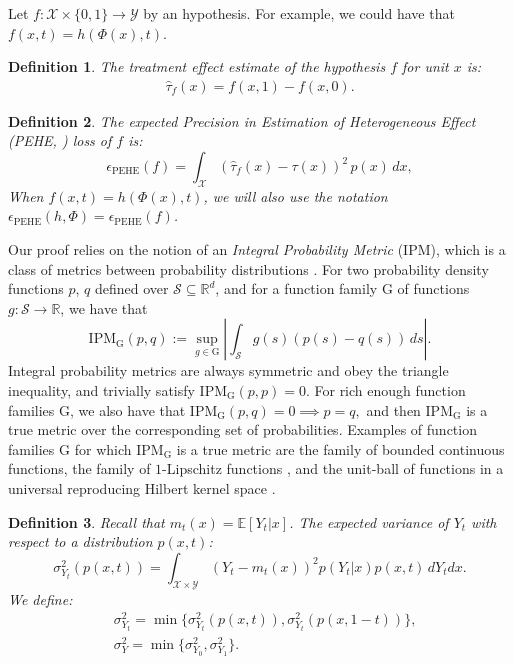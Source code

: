\documentclass{article}
\newtheorem{thmdef}{Definition}
\def\E{\mathbb{E}}
\def\cX{\mathcal X}
\def\cY{\mathcal Y}
\def\cS{\mathcal S}
\def\cF{\mathrm{G}}
\def \R{\mathbb{R}}
\def \epehe{\epsilon_{\text{PEHE}}}
\begin{document}
Let $f: \cX \times \{0,1\} \rightarrow \cY$ by an hypothesis. For example, we could have that $f(x,t) = h(\Phi(x),t)$.
\begin{thmdef}\label{def:inditeerr}
The treatment effect estimate of the hypothesis $f$ for unit $x$ is:
\begin{align*}
\hat{\tau}_f  (x) = f(x,1) - f(x,0).
\end{align*}
\end{thmdef}


\begin{thmdef}
The expected Precision in Estimation of Heterogeneous Effect (PEHE,  \citet{hill2011bayesian}) loss of $f$ is:
\begin{equation}
\label{eq:pehe}
\epehe(f) = \int_{\cX } \left( \hat{\tau}_f(x) - \tau(x) \right)^2 \, p(x) \, dx ,
\end{equation}
When $f(x,t) = h(\Phi(x),t)$, we will also use the notation $\epehe(h,\Phi) = \epehe(f)$.
\end{thmdef}

Our proof relies on the notion of an \emph{Integral Probability Metric} (IPM), which is a class of metrics between probability distributions \citep{sriperumbudur2012empirical,muller1997integral}.
For two probability density functions $p$, $q$ defined over $\cS \subseteq \R^d$, and for a function family $\cF$ of functions $g : \cS \rightarrow \R$, we have that $$\text{IPM}_\cF(p,q) :=\sup_{g\in \cF} \left| \int_\cS g(s) (p(s)-q(s))\, ds \right|.$$
Integral probability metrics are always symmetric and obey the triangle inequality, and trivially satisfy $\text{IPM}_\cF(p,p) = 0$. For rich enough function families $\cF$, we also have that $\text{IPM}_\cF(p,q) =0 \implies p=q,$ and then $\text{IPM}_\cF$ is a true metric over the corresponding set of probabilities. Examples of function families $\cF$ for which $\text{IPM}_\cF$ is a true metric are the family of bounded continuous functions, the family of $1$-Lipschitz functions \citep{sriperumbudur2012empirical}, and the unit-ball of functions in a universal reproducing Hilbert kernel space \citep{gretton2012mmd}.



\begin{thmdef}
Recall that $m_t(x) = \E\left[Y_t|x\right]$.
The expected variance of $Y_t$ with respect to a distribution $p(x,t)$:
$$\sigma^2_{Y_t}(p(x,t)) = \int_{\cX \times \cY} \left(Y_t - m_t(x)\right)^2 p(Y_t|x)p(x,t) \, dY_t dx .$$
We define:
\begin{align*}
&\sigma^2_{Y_t} = \min\{\sigma^2_{Y_t}(p(x,t)), \sigma^2_{Y_t}(p(x,1-t))\} , \\
&\sigma^2_{Y} = \min\{\sigma^2_{Y_0},\sigma^2_{Y_1}\}.
\end{align*}
\end{thmdef}
\end{document}

